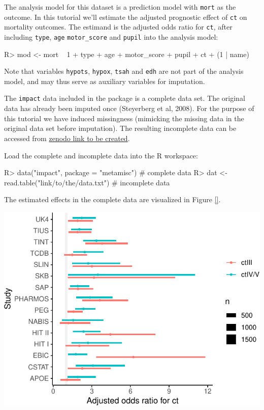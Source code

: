 \documentclass[
]{jss}
\begin{document}
The analysis model for this dataset is a prediction model with
\texttt{mort} as the outcome. In this tutorial we'll estimate the
adjusted prognostic effect of \texttt{ct} on mortality outcomes. The
estimand is the adjusted odds ratio for \texttt{ct}, after including
\texttt{type}, \texttt{age} \texttt{motor\_score} and \texttt{pupil}
into the analysis model:

\begin{CodeChunk}
\begin{CodeInput}
R> mod <- mort ~ 1 + type + age + motor_score + pupil + ct + (1 | name) 
\end{CodeInput}
\end{CodeChunk}

Note that variables \texttt{hypots}, \texttt{hypox}, \texttt{tsah} and
\texttt{edh} are not part of the analysis model, and may thus serve as
auxiliary variables for imputation.

The \texttt{impact} data included in the  package is a
complete data set. The original data has already been imputed once
(Steyerberg et al, 2008). For the purpose of this tutorial we have
induced missingness (mimicking the missing data in the original data set
before imputation). The resulting incomplete data can be accessed from
\href{https://zenodo.com}{zenodo link to be created}.

Load the complete and incomplete data into the R workspace:

\begin{CodeChunk}
\begin{CodeInput}
R> data("impact", package = "metamisc")      # complete data
R> dat <- read.table("link/to/the/data.txt") # incomplete data
\end{CodeInput}
\end{CodeChunk}

The estimated effects in the complete data are visualized in Figure
\ref{}.

\begin{CodeChunk}


\begin{center}\includegraphics{Imputation_of_Incomplete_Multilevel_Data_files/figure-latex/forest-1} \end{center}

\end{CodeChunk}
\end{document}
